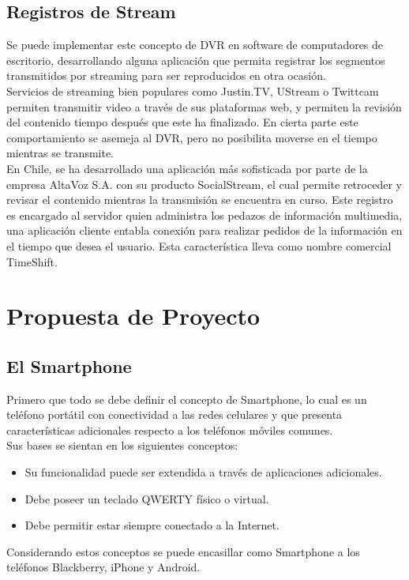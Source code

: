 \subsection{Registros de Stream}

Se puede implementar este concepto de DVR en software de computadores de escritorio, desarrollando alguna aplicación que permita registrar los segmentos transmitidos por streaming para ser reproducidos en otra ocasión. \\

	Servicios de streaming bien populares como Justin.TV, UStream o Twittcam permiten transmitir video a través de sus plataformas web, y permiten la revisión del contenido tiempo después que este ha finalizado. En cierta parte este comportamiento se asemeja al DVR, pero no posibilita moverse en el tiempo mientras se transmite.\\

En Chile, se ha desarrollado una aplicación más sofisticada por parte de la empresa AltaVoz S.A. con su producto SocialStream, el cual permite retroceder y revisar el contenido mientras la transmisión se encuentra en curso. Este registro es encargado al servidor quien administra los pedazos de información multimedia, una aplicación cliente entabla conexión para realizar pedidos de la información en el tiempo que desea el usuario.
Esta característica lleva como nombre comercial TimeShift.

\section{Propuesta de Proyecto}
\subsection{El Smartphone}
Primero que todo se debe definir el concepto de Smartphone, lo cual es un teléfono portátil con conectividad a las redes celulares y que presenta características adicionales respecto a los teléfonos móviles comunes.\\

Sus bases se sientan en los siguientes conceptos:
\begin{itemize}
\item Su funcionalidad puede ser extendida a través de aplicaciones adicionales.
\item Debe poseer un teclado QWERTY físico o virtual.
\item Debe permitir estar siempre conectado a la Internet.
\end{itemize}
Considerando estos conceptos se puede encasillar como Smartphone a los teléfonos Blackberry, iPhone y Android.

